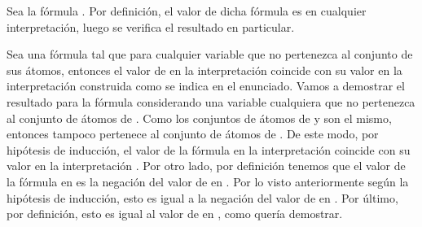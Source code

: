 \begin{isabellebody}
\begin{isamarkuptext}
\begin{demostracion}
  Sea la fórmula \isa{{\isasymbottom}}. Por definición, el valor de dicha fórmula es 
   en cualquier interpretación, luego se verifica el
  resultado en particular.

  Sea  una fórmula tal que para cualquier variable que no pertenezca
  al conjunto de sus átomos, entonces el valor de  en la 
  interpretación \isa{{\isasymA}} coincide con su valor en la interpretación \isa{{\isasymA}{\isacharprime}} 
  construida como se indica en el enunciado. Vamos a demostrar el 
  resultado para la fórmula  considerando una variable  
  cualquiera que no pertenezca al conjunto de átomos de . Como 
  los conjuntos de átomos de  y  son el mismo, entonces  
  tampoco pertenece al conjunto de átomos de . De este modo, por 
  hipótesis de inducción, el valor de la fórmula  en la 
  interpretación \isa{{\isasymA}} coincide con su valor en la interpretación 
  \isa{{\isasymA}{\isacharprime}}. Por otro lado, por definición tenemos que el valor de la 
  fórmula  en \isa{{\isasymA}} es la negación del valor de  en \isa{{\isasymA}}. 
  Por lo visto anteriormente según la hipótesis de inducción, esto es 
  igual a la negación del valor de  en \isa{{\isasymA}{\isacharprime}}. Por último, 
  por definición, esto es igual al valor de  en \isa{{\isasymA}{\isacharprime}}, como 
  quería demostrar.


\end{demostracion}
\end{isamarkuptext}
\end{isabellebody}
